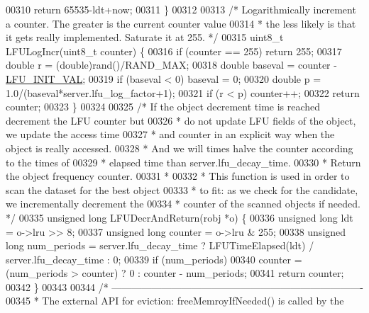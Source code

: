 \begin{DoxyCode}
00310     \textcolor{keywordflow}{return} 65535-ldt+now;
00311 \}
00312 
00313 \textcolor{comment}{/* Logarithmically increment a counter. The greater is the current counter value}
00314 \textcolor{comment}{ * the less likely is that it gets really implemented. Saturate it at 255. */}
00315 uint8\_t LFULogIncr(uint8\_t counter) \{
00316     \textcolor{keywordflow}{if} (counter == 255) \textcolor{keywordflow}{return} 255;
00317     \textcolor{keywordtype}{double} r = (\textcolor{keywordtype}{double})rand()/RAND\_MAX;
00318     \textcolor{keywordtype}{double} baseval = counter - \hyperlink{server_8h_a8cec44bf7da67aac58839ab5033bdc0a}{LFU\_INIT\_VAL};
00319     \textcolor{keywordflow}{if} (baseval < 0) baseval = 0;
00320     \textcolor{keywordtype}{double} p = 1.0/(baseval*server.lfu\_log\_factor+1);
00321     \textcolor{keywordflow}{if} (r < p) counter++;
00322     \textcolor{keywordflow}{return} counter;
00323 \}
00324 
00325 \textcolor{comment}{/* If the object decrement time is reached decrement the LFU counter but}
00326 \textcolor{comment}{ * do not update LFU fields of the object, we update the access time}
00327 \textcolor{comment}{ * and counter in an explicit way when the object is really accessed.}
00328 \textcolor{comment}{ * And we will times halve the counter according to the times of}
00329 \textcolor{comment}{ * elapsed time than server.lfu\_decay\_time.}
00330 \textcolor{comment}{ * Return the object frequency counter.}
00331 \textcolor{comment}{ *}
00332 \textcolor{comment}{ * This function is used in order to scan the dataset for the best object}
00333 \textcolor{comment}{ * to fit: as we check for the candidate, we incrementally decrement the}
00334 \textcolor{comment}{ * counter of the scanned objects if needed. */}
00335 \textcolor{keywordtype}{unsigned} \textcolor{keywordtype}{long} LFUDecrAndReturn(robj *o) \{
00336     \textcolor{keywordtype}{unsigned} \textcolor{keywordtype}{long} ldt = o->lru >> 8;
00337     \textcolor{keywordtype}{unsigned} \textcolor{keywordtype}{long} counter = o->lru & 255;
00338     \textcolor{keywordtype}{unsigned} \textcolor{keywordtype}{long} num\_periods = server.lfu\_decay\_time ? LFUTimeElapsed(ldt) / server.lfu\_decay\_time : 
      0;
00339     \textcolor{keywordflow}{if} (num\_periods)
00340         counter = (num\_periods > counter) ? 0 : counter - num\_periods;
00341     \textcolor{keywordflow}{return} counter;
00342 \}
00343 
00344 \textcolor{comment}{/* ----------------------------------------------------------------------------}
00345 \textcolor{comment}{ * The external API for eviction: freeMemroyIfNeeded() is called by the}

\end{DoxyCode}

